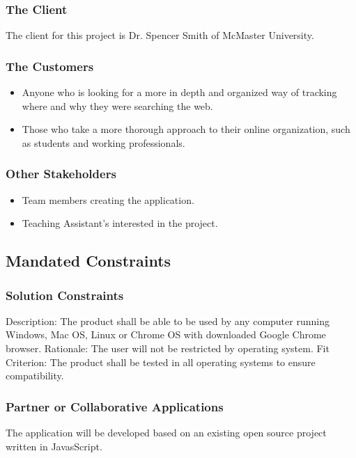 \documentclass[12pt, titlepage]{article}
\begin{document}
\subsubsection{The Client}

The client for this project is Dr. Spencer Smith of McMaster University.

\subsubsection{The Customers}

\begin{itemize}
	\item Anyone who is looking for a more in depth and organized way of tracking where 
	and why they were searching the web.
	\item Those who take a more thorough approach to their online organization, such as 
	students and working professionals.
\end{itemize}

\subsubsection{Other Stakeholders}

\begin{itemize}
	\item Team members creating the application. 
	\item Teaching Assistant's interested in the project. 
\end{itemize}

\subsection{Mandated Constraints} %
\subsubsection{Solution Constraints}
Description: The product shall be able to be used by any computer running Windows, 
Mac OS, Linux or Chrome OS with downloaded Google Chrome browser.
Rationale: The user will not be restricted by operating system.
Fit Criterion: The product shall be tested in all operating systems to ensure compatibility. 

\subsubsection{Partner or Collaborative Applications}
The application will be developed based on an existing open source project written in 
JavasScript. 
\end{document}
